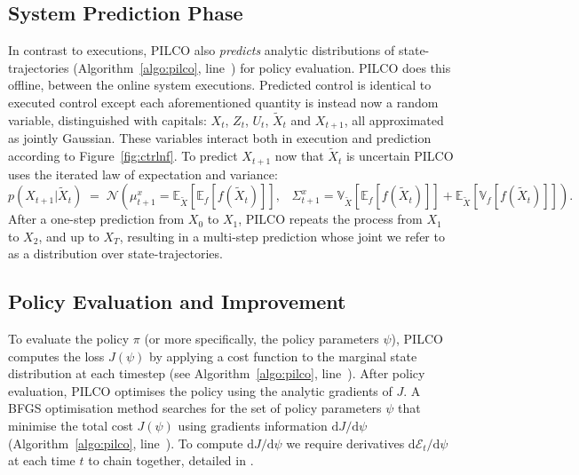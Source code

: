 \documentclass{article}
\newcommand{\N}{\mathcal{N}}
\newcommand{\E}{{\mathbb E}}
\newcommand{\V}{{\mathbb V}}
\newcommand{\now}[1]{#1_t}
\newcommand{\nowt}[1]{\tilde #1_t}
\newcommand{\new}[1]{#1_{t+1}}
\newcommand{\newT}[1]{#1_{T}}
\newcommand{\fx}{f} %
\newcommand{\der}{\text{d}} %
\newcommand{\expcost}{\mathcal{E}}
\newcommand{\policyparams}{\psi} %
\begin{document}
\subsection{System Prediction Phase} %
In contrast to executions,
PILCO also \textit{predicts} analytic distributions of state-trajectories
(Algorithm~\ref{algo:pilco}, line~\linepredict)
for policy evaluation.
PILCO does this offline, between the online system executions.
Predicted control is identical to executed control
except each aforementioned quantity is instead now a random variable,
distinguished with capitals:
$\now{X}$, $\now{Z}$, $\now{U}$, $\nowt{X}$ and $\new{X}$,
all approximated as jointly Gaussian.
%
These variables interact
both in execution and prediction
according to Figure~\ref{fig:ctrlnf}.
%
To predict $\new{X}$ now that %
$\nowt{X}$ is uncertain PILCO uses the iterated law of expectation and variance:
\begin{equation}
p(\new{X}|\nowt{X})\;=\;\N(\new{\mu}^x = \E_{\tilde X}[\E_\fx[\fx(\nowt{X})]],\;\;\;
\new{\Sigma}^x = \V_{\tilde X}[\E_\fx[\fx(\nowt{X})]] + \E_{\tilde X}[\V_\fx[\fx(\nowt{X})]]).
\end{equation}
After a one-step prediction from $X_0$ to $X_1$,
PILCO repeats the process from $X_1$ to $X_2$, and up to $\newT{X}$,
resulting in a multi-step prediction
whose joint we refer to as a distribution over state-trajectories. %

\subsection{Policy Evaluation and Improvement}
To evaluate the policy $\pi$ (or more specifically, the policy parameters $\policyparams$),
PILCO computes the loss $J(\policyparams)$ by applying a cost function to the marginal state distribution at each timestep
(see Algorithm~\ref{algo:pilco}, line~\lineevaluate).
After policy evaluation, PILCO optimises the policy using the analytic gradients of $J$. %
A BFGS optimisation method %
searches for the set of policy parameters $\policyparams$
that minimise the total cost $J(\policyparams)$
using gradients information $\der J/\der\policyparams$
(Algorithm~\ref{algo:pilco}, line~\lineoptimise).
%
To compute $\der J/\der\policyparams$
we require derivatives $\der \now{\expcost} / \der \policyparams$
at each time $t$ to chain together,
detailed in \cite{pilco}.
\end{document}
